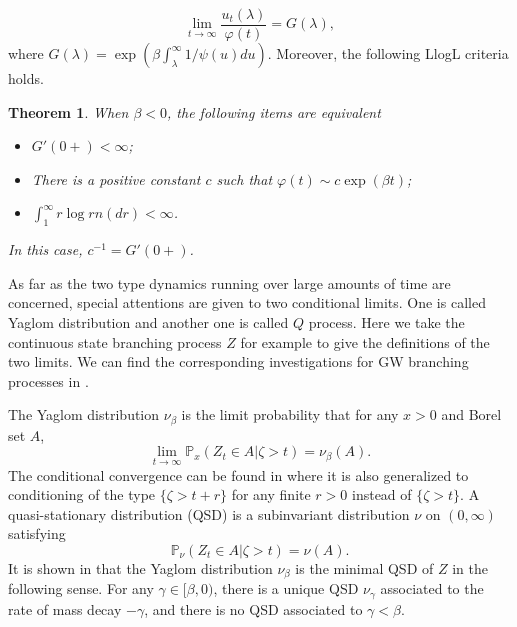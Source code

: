 \documentclass[12pt,a4paper]{amsart}
\numberwithin{equation}{section}
\theoremstyle{plain}
\newtheorem{thm}{Theorem}[section]
\theoremstyle{definition}
\begin{document}
\[
	\lim_{t\rightarrow\infty}\frac{u_t(\lambda)}{\varphi(t)}=G(\lambda),
\]
where $G(\lambda)=\exp(\beta\int_{\lambda}^\infty1/\psi(u)du)$. Moreover, the
following LlogL criteria holds.
\begin{thm}
  \label{thm:equivalent_for_cbp}
	When $\beta<0$, the following items are equivalent
  \begin{itemize}
  \item[$(i).$] $G'(0+)<\infty$;
  \item[$(ii).$] There is a positive constant $c$ such that $\varphi(t)\sim
    c\exp(\beta t)$;
  \item[$(iii).$] $\int_1^\infty r\log r n(dr)<\infty$.
  \end{itemize}
  In this case, $c^{-1}=G'(0+)$.
\end{thm}
As far as the two type dynamics running over large amounts of time are
concerned, special attentions are given to two conditional limits. One is called
Yaglom distribution and another one is called $Q$ process. Here we take the
continuous state branching process $Z$ for example to give the definitions of
the two limits. We can find the corresponding investigations for GW branching
processes in \cite{AthreyaNey1972Branching}.

The Yaglom distribution $\nu_{\beta}$ is the limit probability that for any
$x>0$ and Borel set $A$,
\[
	\lim_{t\rightarrow\infty}\mathbb P_x(Z_t\in A\big|\zeta>t)=\nu_{\beta}(A).
\]
The conditional convergence can be found in \cite{Li2000Asymptotic} where it is
also generalized to conditioning of the type $\{\zeta>t+r\}$ for any finite
$r>0$ instead of $\{\zeta>t\}$. A quasi-stationary distribution (QSD) is a
subinvariant distribution $\nu$ on $(0,\infty)$ satisfying
\[
	\mathbb P_{\nu}(Z_t\in A|\zeta>t)=\nu(A).
\]
It is shown in \cite{Lambert2007Quasistationary} that the Yaglom distribution
$\nu_{\beta}$ is the minimal QSD of $Z$ in the following sense. For any
$\gamma\in[\beta,0)$, there is a unique QSD $\nu_{\gamma}$ associated to the
rate of mass decay $-\gamma$, and there is no QSD associated to $\gamma<\beta$.
\end{document}
